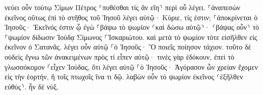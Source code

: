 \documentclass{openreader}
\begin{document}
νεύει οὖν τούτῳ Σίμων Πέτρος ⸂πυθέσθαι τίς ἂν εἴη⸃ περὶ οὗ λέγει. 
⸀ἀναπεσὼν ἐκεῖνος οὕτως ἐπὶ τὸ στῆθος τοῦ Ἰησοῦ λέγει αὐτῷ· Κύριε, τίς ἐστιν; 
⸀ἀποκρίνεται ὁ Ἰησοῦς· Ἐκεῖνός ἐστιν ᾧ ἐγὼ ⸀βάψω τὸ ψωμίον ⸂καὶ δώσω αὐτῷ⸃· ⸂βάψας οὖν⸃ τὸ ⸀ψωμίον δίδωσιν Ἰούδᾳ Σίμωνος ⸀Ἰσκαριώτου. 
καὶ μετὰ τὸ ψωμίον τότε εἰσῆλθεν εἰς ἐκεῖνον ὁ Σατανᾶς. λέγει οὖν αὐτῷ ⸀ὁ Ἰησοῦς· Ὃ ποιεῖς ποίησον τάχιον. 
τοῦτο δὲ οὐδεὶς ἔγνω τῶν ἀνακειμένων πρὸς τί εἶπεν αὐτῷ· 
τινὲς γὰρ ἐδόκουν, ἐπεὶ τὸ γλωσσόκομον ⸀εἶχεν Ἰούδας, ὅτι λέγει αὐτῷ ⸀ὁ Ἰησοῦς· Ἀγόρασον ὧν χρείαν ἔχομεν εἰς τὴν ἑορτήν, ἢ τοῖς πτωχοῖς ἵνα τι δῷ. 
λαβὼν οὖν τὸ ψωμίον ἐκεῖνος ⸂ἐξῆλθεν εὐθύς⸃. ἦν δὲ νύξ. 
\end{document}
